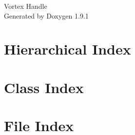 \let\mypdfximage\pdfximage\def\pdfximage{\immediate\mypdfximage}\documentclass[twoside]{book}
\newcommand{\+}{\discretionary{\mbox{\scriptsize$\hookleftarrow$}}{}{}}
\newcommand{\clearemptydoublepage}{%
  \newpage{\pagestyle{empty}\cleardoublepage}%
}
\begin{document}
\raggedbottom

\hypersetup{pageanchor=false,
             bookmarksnumbered=true,
             pdfencoding=unicode
            }
\begin{titlepage}
\vspace*{7cm}
\begin{center}%
{\Large Vortex Handle }\\
\vspace*{1cm}
{\large Generated by Doxygen 1.9.1}\\
\end{center}
\end{titlepage}
\clearemptydoublepage
{}
\tableofcontents
\clearemptydoublepage
{}
\hypersetup{pageanchor=true}

\chapter{Hierarchical Index}

\chapter{Class Index}

\chapter{File Index}

\end{document}
